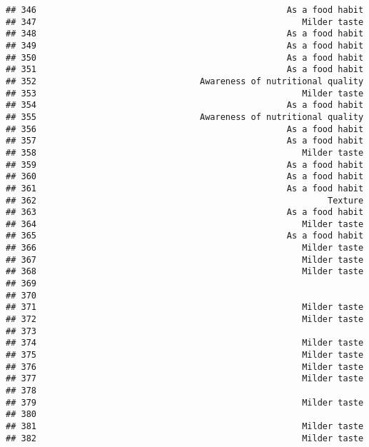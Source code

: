 \documentclass[
]{article}
\begin{document}
\begin{verbatim}
## 346                                                 As a food habit
## 347                                                    Milder taste
## 348                                                 As a food habit
## 349                                                 As a food habit
## 350                                                 As a food habit
## 351                                                 As a food habit
## 352                                Awareness of nutritional quality
## 353                                                    Milder taste
## 354                                                 As a food habit
## 355                                Awareness of nutritional quality
## 356                                                 As a food habit
## 357                                                 As a food habit
## 358                                                    Milder taste
## 359                                                 As a food habit
## 360                                                 As a food habit
## 361                                                 As a food habit
## 362                                                         Texture
## 363                                                 As a food habit
## 364                                                    Milder taste
## 365                                                 As a food habit
## 366                                                    Milder taste
## 367                                                    Milder taste
## 368                                                    Milder taste
## 369                                                                
## 370                                                                
## 371                                                    Milder taste
## 372                                                    Milder taste
## 373                                                                
## 374                                                    Milder taste
## 375                                                    Milder taste
## 376                                                    Milder taste
## 377                                                    Milder taste
## 378                                                                
## 379                                                    Milder taste
## 380                                                                
## 381                                                    Milder taste
## 382                                                    Milder taste

\end{verbatim}
\end{document}
